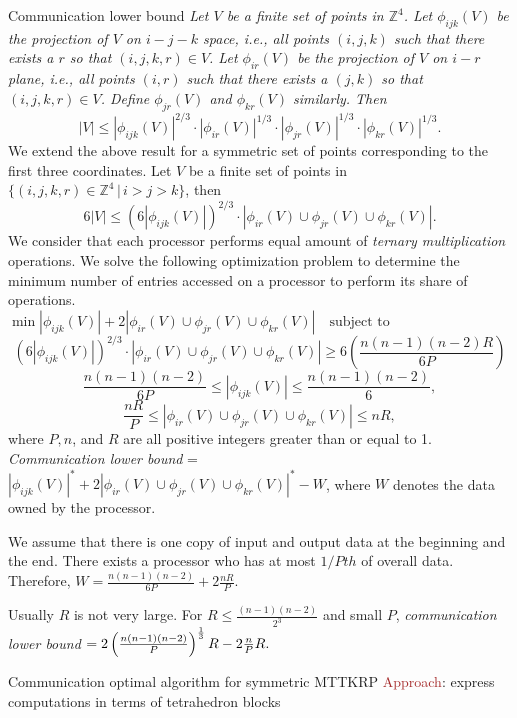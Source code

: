 \documentclass[final]{beamer}
\newlength{\colwidth}
\newcommand{\arraymul}{\emph{ternary multiplication}\xspace}
\begin{document}
\begin{frame}[t]
\begin{columns}[t]
\begin{column}{\colwidth}
\begin{block}{Communication lower bound}
\emph{
		Let $V$ be a finite set of points in $\mathbb{Z}^4$. Let $\phi_{ijk}(V)$ be the projection of $V$ on $i-j-k$ space, i.e., all points $(i,j,k)$ such that there exists a $r$ so that $(i,j,k,r) \in V$. Let $\phi_{ir}(V)$ be the projection of $V$ on $i-r$ plane, i.e., all points $(i,r)$ such that there exists a $(j,k)$ so that $(i,j,k,r) \in V$.  Define $\phi_{jr}(V)$ and $\phi_{kr}(V)$ similarly. 
		Then 
		$$|V| \leq |\phi_{ijk}(V)|^{2/3} \cdot |\phi_{ir}(V)|^{1/3}\cdot |\phi_{jr}(V)|^{1/3}\cdot |\phi_{kr}(V)|^{1/3}.$$
	}
We extend the above result for a symmetric set of points corresponding to the first three coordinates. Let $V$ be a finite set of points in  $\{(i, j, k, r)\in\mathbb{Z}^4 \, | \, i>j>k\}$, then
	$$6|V| \leq (6|\phi_{ijk}(V)|)^{2/3} \cdot |\phi_{ir}(V) \cup \phi_{jr}(V) \cup \phi_{kr}(V)|.$$
We consider that each processor performs equal amount of \arraymul operations. We solve the following optimization problem to determine the minimum number of entries accessed on a processor to perform its share of operations.
	$$\min |\phi_{ijk}(V)| + 2|\phi_{ir}(V) \cup \phi_{jr}(V) \cup \phi_{kr}(V)| \quad \text{subject to}\qquad\qquad\qquad\qquad\qquad\qquad$$
$$(6|\phi_{ijk}(V)|)^{2/3} \cdot |\phi_{ir}(V) \cup \phi_{jr}(V) \cup \phi_{kr}(V)| \geq 6\left(\frac{n(n-1)(n-2)R}{6P}\right) $$
$$\frac{n(n-1)(n-2)}{6P} \leq |\phi_{ijk}(V)| \leq \frac{n(n-1)(n-2)}{6},$$
$$\frac{nR}{P} \leq |\phi_{ir}(V) \cup \phi_{jr}(V) \cup \phi_{kr}(V)| \leq nR,$$
where $P,n$, and $R$ are all positive integers greater than or equal to 1.
\emph{Communication lower bound} = $|\phi_{ijk}(V)|^* + 2|\phi_{ir}(V) \cup \phi_{jr}(V) \cup \phi_{kr}(V)|^* -W$, where $W$ denotes the data owned by the processor.

We assume that there is one copy of input and output data at the beginning and the end. There exists a processor who has at most $1/Pth$ of overall data. Therefore, $W=\frac{n(n-1)(n-2)}{6P} + 2\frac{nR}{P}$.

Usually $R$ is not very large. For $R \leq \frac{(n-1)(n-2)}{2^3}$ and small $P$, \emph{communication lower bound} $= 2\left(\frac{n(n-1)(n-2)}{P}\right)^{\frac13}R - 2\frac{n}{P}R\text.$

\end{block}
\begin{block}{Communication optimal algorithm for symmetric MTTKRP}
\textcolor{brown}{Approach}: express computations in terms of tetrahedron blocks


\end{block}
\end{column}
\end{columns}
\end{frame}
\end{document}
